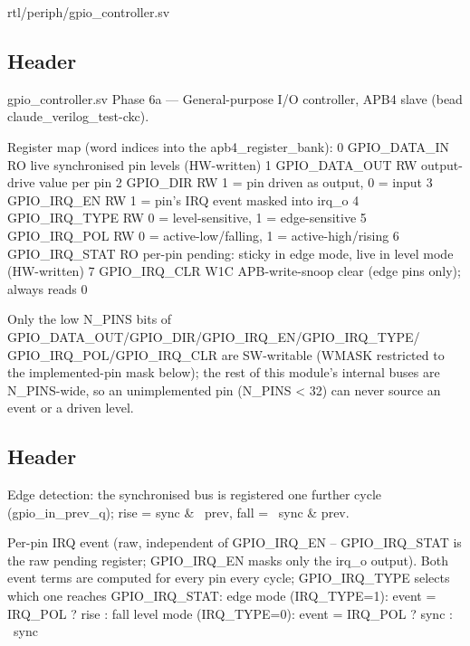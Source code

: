 \begin{relocated}{rtl/periph/gpio_controller.sv}

\subsection*{Header}

\begin{textblock}
gpio_controller.sv
Phase 6a — General-purpose I/O controller, APB4 slave (bead claude_verilog_test-ckc).

Register map (word indices into the apb4_register_bank):
  0  GPIO_DATA_IN   RO             live synchronised pin levels (HW-written)
  1  GPIO_DATA_OUT  RW             output-drive value per pin
  2  GPIO_DIR       RW             1 = pin driven as output, 0 = input
  3  GPIO_IRQ_EN    RW             1 = pin's IRQ event masked into irq_o
  4  GPIO_IRQ_TYPE  RW             0 = level-sensitive, 1 = edge-sensitive
  5  GPIO_IRQ_POL   RW             0 = active-low/falling, 1 = active-high/rising
  6  GPIO_IRQ_STAT  RO             per-pin pending: sticky in edge mode,
                                   live in level mode (HW-written)
  7  GPIO_IRQ_CLR   W1C            APB-write-snoop clear (edge pins only);
                                   always reads 0

Only the low N_PINS bits of GPIO_DATA_OUT/GPIO_DIR/GPIO_IRQ_EN/GPIO_IRQ_TYPE/
GPIO_IRQ_POL/GPIO_IRQ_CLR are SW-writable (WMASK restricted to the
implemented-pin mask below); the rest of this module's internal buses are
N_PINS-wide, so an unimplemented pin (N_PINS < 32) can never source an
event or a driven level.
\end{textblock}

\subsection*{Header}

\begin{textblock}
Edge detection: the synchronised bus is registered one further cycle
(gpio_in_prev_q); rise = sync & ~prev, fall = ~sync & prev.

Per-pin IRQ event (raw, independent of GPIO_IRQ_EN -- GPIO_IRQ_STAT is the
raw pending register; GPIO_IRQ_EN masks only the irq_o output). Both event
terms are computed for every pin every cycle; GPIO_IRQ_TYPE selects which
one reaches GPIO_IRQ_STAT:
  edge mode  (IRQ_TYPE=1): event = IRQ_POL ? rise : fall
  level mode (IRQ_TYPE=0): event = IRQ_POL ? sync : ~sync


\end{textblock}
\end{relocated}
